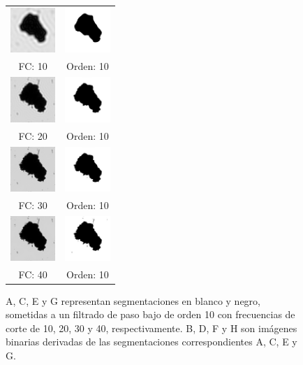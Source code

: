 \begin{figure}[h] 
\begin{tabular}{cc}
    \includegraphics[width=1.7cm]{images/F05-A.png} &
    \includegraphics[width=1.7cm]{images/F05-B.jpeg} \\
    FC: 10 & Orden: 10 \\
    \includegraphics[width=1.7cm]{images/F05-C.png} & 
    \includegraphics[width=1.7cm]{images/F05-D.jpeg} \\
    FC: 20 & Orden: 10 \\
    \includegraphics[width=1.7cm]{images/F05-E.png} &
    \includegraphics[width=1.7cm]{images/F05-F.jpeg} \\
    FC: 30 & Orden: 10 \\
    \includegraphics[width=1.7cm]{images/F05-G.jpeg} & 
    \includegraphics[width=1.7cm]{images/F05-H.jpeg} \\
    FC: 40 & Orden: 10 \\
\end{tabular}
\vspace{10pt}
\caption{\footnotesize A, C, E y G representan segmentaciones en blanco y negro, sometidas a un filtrado de paso bajo de orden 10 con frecuencias de corte de 10, 20, 30 y 40, respectivamente. B, D, F y H son imágenes binarias derivadas de las segmentaciones correspondientes A, C, E y G.}  
\label{fig05} 
\end{figure}

